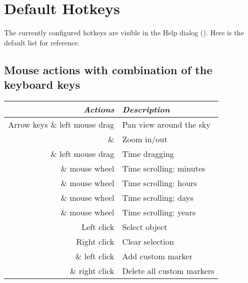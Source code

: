 
\chapter{Default Hotkeys}
\label{ch:Hotkeys}

The currently configured hotkeys are visible in the Help dialog (). Here is the default list for reference.

\section{Mouse actions with combination of the keyboard keys}
\label{ch:Hotkeys:MouseKeys}
\begin{longtabu} to \textwidth {rl}\toprule
\emph{Actions}	& \emph{Description}\\\midrule
Arrow keys \& left mouse drag	& Pan view around the sky \\
 \&  & Zoom in/out \\
\key{\ctrl} \& left mouse drag & Time dragging \\
\key{\ctrl} \& mouse wheel & Time scrolling: minutes \\
 \& mouse wheel & Time scrolling: hours \\
 \& mouse wheel & Time scrolling: days \\
 \& mouse wheel & Time scrolling: years \\
Left click & Select object \\
Right click & Clear selection \\
 \& left click & Add custom marker \\
 \& right click & Delete all custom markers 
\\\bottomrule
\end{longtabu}

